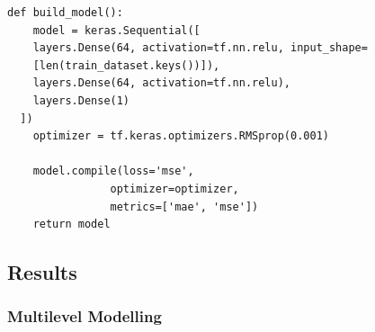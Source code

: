\documentclass[a4paper,UKenglish]{lipics-v2018}
\begin{document}
\begin{lstlisting}[caption= Artificial Neural Network (all models) example]
def build_model():
    model = keras.Sequential([
    layers.Dense(64, activation=tf.nn.relu, input_shape=
    [len(train_dataset.keys())]),
    layers.Dense(64, activation=tf.nn.relu),
    layers.Dense(1)
  ])
    optimizer = tf.keras.optimizers.RMSprop(0.001)
    
    model.compile(loss='mse',
                optimizer=optimizer,
                metrics=['mae', 'mse'])
    return model
\end{lstlisting}

\subsection{Results}
\subsubsection{Multilevel Modelling}
\end{document}
